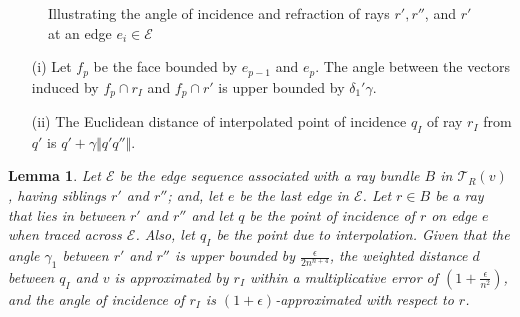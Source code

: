 \documentclass[11pt]{article}
\def\calT{\mathcal{T}}
\def\calE{\mathcal{E}}
\newtheorem{lemma}{Lemma}[section]
\begin{document}
\begin{wrapfigure}{r}{0.5\textwidth}
\centering
\begin{minipage}[b]{.4\textwidth}
\caption{\footnotesize Illustrating the angle of incidence and refraction of rays $r', r''$, and $r'$ at an edge $e_i \in \calE$}
\label{fig:interpolangles}
\end{minipage}
\end{wrapfigure}

\begin{itemize}
\vspace{-0.1in}
\item[(i)]
Let $f_p$ be the face bounded by $e_{p-1}$ and $e_p$.
The angle between the vectors induced by $f_p \cap r_I$ and $f_p \cap r'$ is upper bounded by $\delta_1'\gamma$.

\item[(ii)]
The Euclidean distance of interpolated point of incidence $q_I$ of ray $r_I$ from $q'$ is $q' + \gamma \Vert q'q'' \Vert$.
\vspace{0.05in}
\end{itemize}

\begin{lemma}
\label{lem:interpolate}
Let $\calE$ be the edge sequence associated with a ray bundle $B$ in ${\calT}_R(v)$, having siblings $r'$ and  $r''$; and, let $e$ be the last edge in $\calE$.
Let $r \in B$ be a ray that lies in between $r'$ and $r''$ and let $q$ be the point of incidence of $r$ on edge $e$ when traced across $\calE$.
Also, let $q_I$ be the point due to interpolation. 
Given that the angle $\gamma_1$ between $r'$ and $r''$ is upper bounded by $\frac{\epsilon}{2n^{n+4}}$, the weighted distance $d$ between $q_I$ and $v$ is approximated by $r_I$ within a multiplicative error of $(1+\frac{\epsilon}{n^2})$, and the angle of incidence of $r_I$ is $(1+\epsilon)$-approximated with respect to $r$.
\end{lemma}
\end{document}
